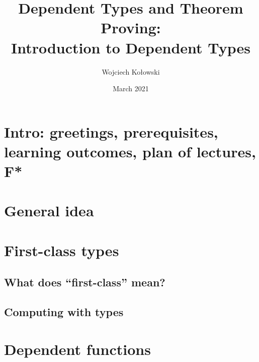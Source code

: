 \documentclass{beamer}
\title{Dependent Types and Theorem Proving: \\Introduction to Dependent Types}
\author{Wojciech Kołowski}
\date{March 2021}
\begin{document}
\frame{\titlepage}
\frame{\tableofcontents}

\section{Intro: greetings, prerequisites, learning outcomes, plan of lectures, F*}


\section{General idea}

\section{First-class types}

\subsection{What does ``first-class'' mean?}


\subsection{Computing with types}


\section{Dependent functions}
\end{document}

